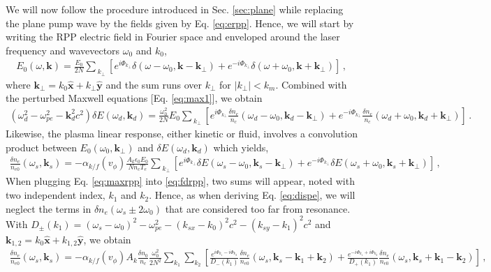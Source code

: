 \documentclass[
 reprint,
 amsmath,amssymb,
 aps,
]{revtex4-1}
\begin{document}
 \begin{widetext}
We will now follow the procedure introduced in Sec. \ref{sec:plane} while replacing the plane pump wave by the fields given by Eq. \eqref{eq:erpp}. Hence, we will start by writing the RPP electric field in Fourier space and enveloped around the laser frequency and wavevectors $\omega_0$ and $k_0$,
\begin{align}
E_0(\omega,\mathbf{k}) = \frac{E_0}{2N} \sum_{\ k_{\perp} }[ e^{i\Phi_{k_\perp}}\delta(\omega-\omega_0, \mathbf{k}-\mathbf{k}_\perp)    + e^{-i\Phi_{k_\perp}}\delta(\omega+\omega_0, \mathbf{k}+\mathbf{k}_\perp) ]
\, , \label{eq:erppf}
\end{align}
 where $\mathbf{k}_\perp= k_0\hat{\mathbf{x}} +k_\perp \hat{\mathbf{y}}$ and the sum runs over $k_\perp$ for $\vert k_\perp\vert  <k_m$.
 Combined with the perturbed Maxwell equations [Eq. \eqref{eq:max1}], we obtain
 \begin{align}
    (\omega_d^2 - \omega_{pe}^2 -\mathbf{k}_d^2c^2)\delta E(\omega_d,\mathbf{k}_d) = \frac{\omega_0^2}{2N} E_0 \sum_{\ k_{\perp} }   \left[e^{i\Phi_{k_\perp}}\frac{\delta n_e }{n_c}(\omega_d-\omega_0, \mathbf{k}_d-\mathbf{k}_\perp) +e^{-i\Phi_{k_\perp}}\frac{\delta n_e }{n_c}(\omega_d+\omega_0, \mathbf{k}_d+\mathbf{k}_\perp) \right] \, .\label{eq:maxrpp}
\end{align}
Likewise, the plasma linear response, either kinetic or fluid, involves a convolution product between $E_0(\omega_0,\mathbf{k}_\perp)$ and $\delta E(\omega_d,\mathbf{k}_d)$ which yields,
\begin{align}
   \frac{\delta n_e }{n_{e0}}(\omega_s,\mathbf{k}_s) = -\alpha_{k/f}(v_\phi) \frac{A_k\epsilon_0 E_0}{Nn_c T_e} \sum_{\ k_{\perp} }     \left[e^{i\Phi_{k_\perp}}\delta E(\omega_s-\omega_0, \mathbf{k}_s-\mathbf{k}_{\perp}) +e^{-i\Phi_{k_\perp}}\delta E(\omega_s+\omega_0, \mathbf{k}_s+\mathbf{k}_{\perp}) \right] \, ,\label{eq:fdrpp} 
\end{align}
When plugging Eq. \eqref{eq:maxrpp} into \eqref{eq:fdrpp}, two sums will appear, noted with two independent index, $k_1$ and $k_2$. Hence, as when  deriving Eq. \eqref{eq:dispe}, we will neglect the terms in $\delta n_e(\omega_s\pm 2\omega_0)$ that are considered too far from resonance. With $D_\pm(k_{1})= (\omega_s-\omega_0)^2 - \omega_{pe}^2 -( k_{sx}-k_0) ^2c^2 -( k_{sy}-k_{1}) ^2c^2$ and $\mathbf{k}_{1,2}= k_0\hat{\mathbf{x}} +k_{1,2} \hat{\mathbf{y}}$, we obtain
\begin{align}
   \frac{\delta n_e }{n_{e0}}(\omega_s,\mathbf{k}_s) = -\alpha_{k/f}(v_\phi)A_k \frac{\delta n_0}{n_c} \frac{\omega_0^2}{2N^2}\sum_{ k_{1} } \sum_{ k_{2} }        \left[ \frac{e^{i\Phi_{k_1}-i\Phi_{k_2}} }{D_-(k_{1})}\frac{\delta n_e }{n_{e0}}(\omega_s,\mathbf{k}_s-\mathbf{k}_{1}+\mathbf{k}_{2}) +\frac{e^{-i\Phi_{k_1}+i\Phi_{k_2}}}{D_+(k_{1})} \frac{\delta n_e }{n_{e0}}(\omega_s,\mathbf{k}_s+\mathbf{k}_{1}-\mathbf{k}_{2}) \right] \, ,\label{eq:fddrpp} 
\end{align}
 \end{widetext}
\end{document}
